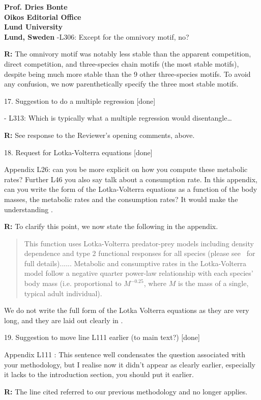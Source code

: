 \documentclass[12pt]{letter}
\begin{document}
\begin{letter}{\bf Prof. Dries Bonte\\
Oikos Editorial Office \\
Lund University \\
Lund, Sweden}
      -L306: Except for the omnivory motif, no?

        \textbf{R:} The omnivory motif was notably less stable than the apparent competition, direct competition, and three-species chain motifs (the most stable motifs), despite being much more stable than the 9 other three-species motifs. To avoid any confusion, we now parenthetically specify the three most stable motifs.


    17. Suggestion to do a multiple regression [done]

      - L313: Which is typically what a multiple regression would disentangle…

      \textbf{R:} See response to the Reviewer's opening comments, above.


    18. Request for Lotka-Volterra equations [done]

      Appendix L26: can you be more explicit on how you compute these metabolic rates? Further L46 you also say talk about a consumption rate. In this appendix, can you write the form of the Lotka-Volterra equations as a function of the body masses, the metabolic rates and the consumption rates? It would make the understanding .

      \textbf{R:}
      To clarify this point, we now state the following in the appendix.
      
      \begin{quotation}
      This function uses Lotka-Volterra predator-prey models including density dependence and type 2 functional responses for all species (please see~\citet{Delmas2017} for full details)...... Metabolic and consumptive rates in the Lotka-Volterra model follow a negative quarter power-law relationship with each species' body mass (i.e. proportional to $M^{-0.25}$, where $M$ is the mass of a single, typical adult individual). 
      \end{quotation}
      
      We do not write the full form of the Lotka Volterra equations as they are very long, and they are laid out clearly in \citep{Delmas2017}.
      

    19. Suggestion to move line L111 earlier (to main text?) [done]

      Appendix L111 : This sentence well condensates the question associated with your methodology, but I realise now it didn’t appear as clearly earlier, especially it lacks to the introduction section, you should put it earlier.


      \textbf{R:} The line cited referred to our previous methodology and no longer applies.



\end{letter}
\end{document}

